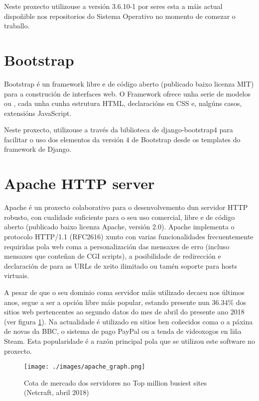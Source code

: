 Neste proxecto utilizouse a versión 3.6.10-1 por seres esta a máis actual dispoñible nos repositorios do Sistema Operativo no momento de comezar o traballo.


\section{Bootstrap}

Bootstrap é un framework libre e de código aberto (publicado baixo licenza MIT) para a construción de interfaces web. O Framework ofrece unha serie de modelos ou , cada unha cunha estrutura HTML, declaracións en CSS e, nalgúns casos, extensións JavaScript.

Neste proxecto, utilizouse a través da biblioteca de django-bootstrap4 para facilitar o uso dos elementos da versión 4 de Bootstrap desde os templates do framework de Django.

\section{Apache HTTP server}

Apache é un proxecto colaborativo para o desenvolvemento dun servidor HTTP robusto, con cualidade suficiente para o seu uso comercial, libre e de código aberto (publicado baixo licenza Apache, versión 2.0\cite{apache}). Apache implementa o protocolo HTTP/1.1 (RFC2616) xunto con varias funcionalidades frecuentemente requiridas pola web coma a personalización das mensaxes de erro (incluso mensaxes que conteñan de CGI scripts), a posibilidade de redirección e declaración de  para as URLs de xeito ilimitado ou tamén soporte para hosts virtuais.

A pesar de que o seu dominio coma servidor máis utilizado decaeu nos últimos anos, segue a ser a opción libre máis popular, estando presente nun 36.34\% dos sitios web pertencentes ao  segundo datos do mes de abril do presente ano 2018 (ver figura \ref{fig:img_netcraft}). Na actualidade é utilizado en sitios ben coñecidos coma o a páxina de novas da BBC, o sistema de pago PayPal ou a tenda de videoxogos en liña Steam\cite{netcraft}. Esta popularidade é a razón principal pola que se utilizou este software no proxecto.

\begin{figure}[h]
	\centering
	\texttt{[image: ./images/apache\_graph.png]}
	\caption{Cota de mercado dos servidores no Top million busiest sites (Netcraft, abril 2018)}
	\label{fig:img_netcraft}
\end{figure}

